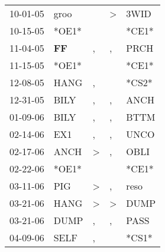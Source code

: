 \begin{supertabular}{p{0.07\textwidth}p{0.06\textwidth}p{0.02\textwidth}p{0.02\textwidth}p{0.06\textwidth}}
          10-01-05\textsuperscript{} &           groo\textsuperscript{} &                  &     \textgreater &           3WID\textsuperscript{} \\
          10-15-05\textsuperscript{} &                            *OE1* &                  &                  &                            *CE1* \\
          11-04-05\textsuperscript{} &    \textbf{FF\textsuperscript{}} &                , &                , &           PRCH\textsuperscript{} \\
          11-15-05\textsuperscript{} &                            *OE1* &                  &                  &                            *CE1* \\
          12-08-05\textsuperscript{} &           HANG\textsuperscript{} &                , &                  &                            *CS2* \\
          12-31-05\textsuperscript{} &           BILY\textsuperscript{} &                , &                , &           ANCH\textsuperscript{} \\
          01-09-06\textsuperscript{} &           BILY\textsuperscript{} &                , &                , &           BTTM\textsuperscript{} \\
          02-14-06\textsuperscript{} &            EX1\textsuperscript{} &                , &                , &           UNCO\textsuperscript{} \\
          02-17-06\textsuperscript{} &           ANCH\textsuperscript{} &     \textgreater &                , &           OBLI\textsuperscript{} \\
          02-22-06\textsuperscript{} &                            *OE1* &                  &                  &                            *CE1* \\
          03-11-06\textsuperscript{} &            PIG\textsuperscript{} &     \textgreater &                , &           reso\textsuperscript{} \\
          03-21-06\textsuperscript{} &           HANG\textsuperscript{} &     \textgreater &     \textgreater &           DUMP\textsuperscript{} \\
          03-21-06\textsuperscript{} &           DUMP\textsuperscript{} &                , &                , &           PASS\textsuperscript{} \\
          04-09-06\textsuperscript{} &           SELF\textsuperscript{} &                , &                  &                            *CS1* \\

\end{supertabular}
